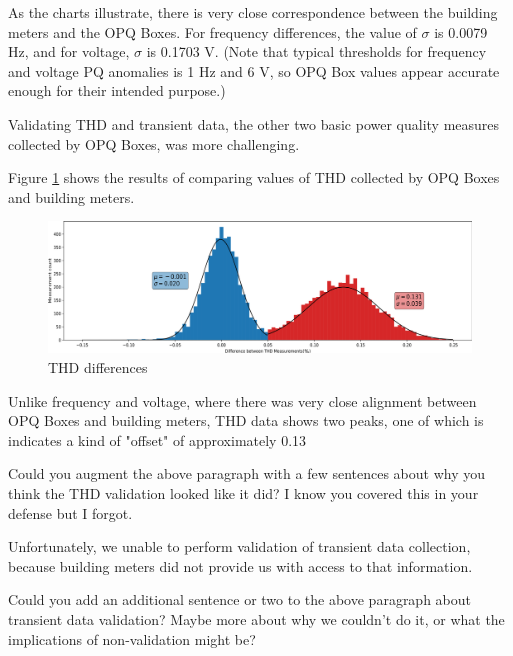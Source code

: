 As the charts illustrate, there is very close correspondence between the building meters and the OPQ Boxes. For frequency differences, the value of $\sigma$ is 0.0079 Hz, and for voltage, $\sigma$ is 0.1703 V. (Note that typical thresholds for frequency and voltage PQ anomalies is 1 Hz and 6 V, so OPQ Box values appear accurate enough for their intended purpose.)

Validating THD and transient data, the other two basic power quality measures collected by OPQ Boxes, was more challenging.

Figure \ref{fig:opqbox-thd-validation} shows the results of comparing values of THD collected by OPQ Boxes and building meters.

\begin{figure}[ht]
  \centering
	\includegraphics[width=0.8\linewidth]{images/pilot/opqbox-thd-validation.png}
	\caption{THD differences}
	\label{fig:opqbox-thd-validation}
\end{figure}

Unlike frequency and voltage, where there was very close alignment between OPQ Boxes and building meters, THD data shows two peaks, one of which is indicates a kind of "offset" of approximately 0.13%

\begin{tcolorbox}[colback=blue!5!white,colframe=blue!75!black,title=SERGE]
Could you augment the above paragraph with a few sentences about why you think the THD validation looked like it did? I know you covered this in your defense but I forgot.
\end{tcolorbox}

Unfortunately, we unable to perform validation of transient data collection, because building meters did not provide us with access to that information.

\begin{tcolorbox}[colback=blue!5!white,colframe=blue!75!black,title=SERGE]
Could you add an additional sentence or two to the above paragraph about transient data validation? Maybe more about why we couldn't do it, or what the implications of non-validation might be?
\end{tcolorbox}

